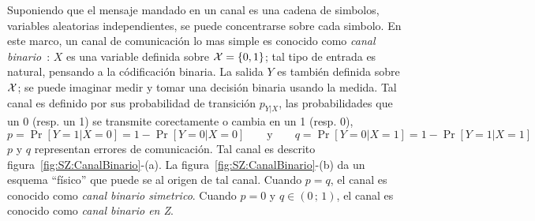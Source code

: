 \begin{figure}[h!]
  \begin{center}    \end{center} 
\label{fig:SZ:CanalComunicacion}
\end{figure}




Suponiendo  que el  mensaje  mandado en  un  canal es  una  cadena de  simbolos,
variables   aleatorias  independientes,   se  puede   concentrarse   sobre  cada
simbolo. En  este marco, un  canal de comunicaci\'on  lo mas simple  es conocido
como  {\it canal  binario}~\cite[Sec.~15]{Sha48}: $X$  es una  variable definida
sobre  $\mathcal{X} =  \{ 0  , 1  \}$;  tal tipo  de entrada  es natural,  pensando a  la
c\'odificaci\'on binaria.   La salida $Y$  es tambi\'en definida sobre  $\mathcal{X}$; se
puede imaginar medir y tomar una decisi\'on binaria usando la medida.  Tal canal
es   definido  por  sus   probabilidad  de   transici\'on  $p_{Y|X}$,   \ie  las
probabilidades que un 0 (resp. un 1)  se transmite corectamente o cambia en un 1
(resp. 0),  \ie
%
\[
p = \Pr[Y = 1 | X = 0] = 1 - \Pr[Y = 0 | X = 0] \qquad \mbox{y} \qquad q = \Pr[Y
= 0 | X = 1] = 1 - \Pr[Y = 1 | X = 1]
\]
%
$p$  y  $q$  representan  errores  de comunicaci\'on.   Tal  canal  es  descrito
figura~\ref{fig:SZ:CanalBinario}-(a).   La  figura~\ref{fig:SZ:CanalBinario}-(b)
da un esquema ``f\'isico'' que puede se  al origen de tal canal. Cuando $p = q$,
el canal es conocido como {\it canal binario simetrico}. Cuando $p = 0$ y $q \in
(0 \, ; \, 1)$, el canal es conocido como {\it canal binario en Z}.

